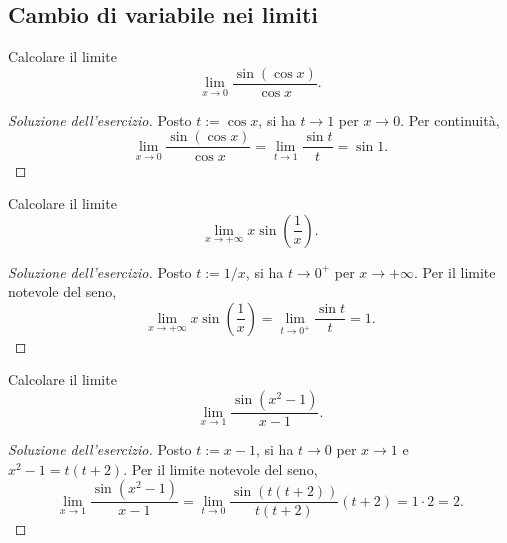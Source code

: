 \subsection{Cambio di variabile nei limiti}
\label{sec:esercizi-limiti-cambio-di-variabile}

\begin{exercise}
\label{ex:limiti-foglio-2311-21}
Calcolare il limite
\[
  \lim_{x\to0}\frac{\sin(\cos x)}{\cos x}.
\]
\end{exercise}
\begin{proof}[Soluzione dell'esercizio]
Posto $t:=\cos x$, si ha $t\to1$ per $x\to0$.
Per continuità,
\[
  \lim_{x\to0}\frac{\sin(\cos x)}{\cos x}
  =\lim_{t\to1}\frac{\sin t}{t}
  =\sin1.
\]
\end{proof}

\begin{exercise}
\label{ex:limiti-foglio-2311-23}
Calcolare il limite
\[
  \lim_{x\to+\infty}x\sin\left(\frac1x\right).
\]
\end{exercise}
\begin{proof}[Soluzione dell'esercizio]
Posto $t:=1/x$, si ha $t\to0^+$ per $x\to+\infty$.
Per il limite notevole del seno,
\[
  \lim_{x\to+\infty}x\sin\left(\frac1x\right)
  =\lim_{t\to0^+}\frac{\sin t}{t}
  =1.
\]
\end{proof}

\clearpage

\begin{exercise}
\label{ex:limiti-foglio-2311-26}
Calcolare il limite
\[
  \lim_{x\to1}\frac{\sin(x^2-1)}{x-1}.
\]
\end{exercise}
\begin{proof}[Soluzione dell'esercizio]
Posto $t:=x-1$, si ha $t\to0$ per $x\to1$ e
$x^2-1=t(t+2)$. Per il limite notevole del seno,
\[
  \lim_{x\to1}\frac{\sin(x^2-1)}{x-1}
  =\lim_{t\to0}\frac{\sin(t(t+2))}{t(t+2)}(t+2)
  =1\cdot2=2.
\]
\end{proof}
